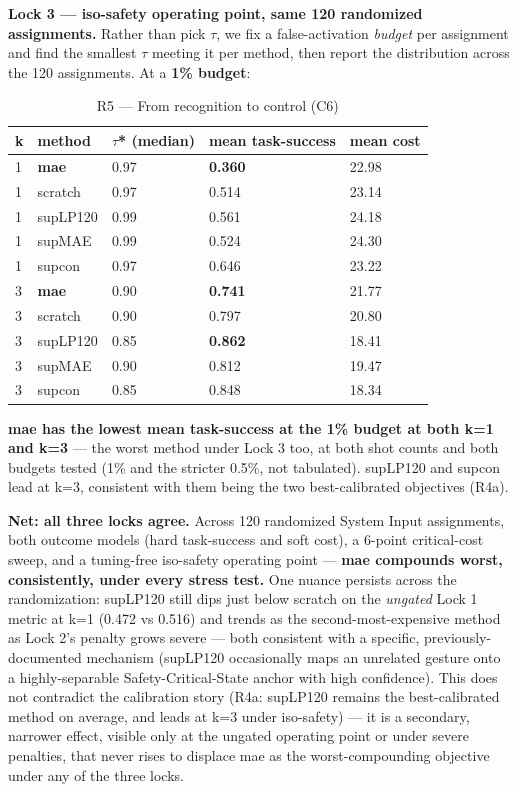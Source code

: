 \textbf{Lock 3 --- iso-safety operating point, same 120 randomized assignments.} Rather than pick $\tau$, we fix a false-activation \textit{budget} per assignment and find the smallest $\tau$ meeting it per method, then report the distribution across the 120 assignments. At a \textbf{1\% budget}:

\begin{table}[!t]
\centering
\caption{R5 --- From recognition to control (C6)}
\small
\begin{tabular}{lllll}
\toprule
k & method & $\tau$* (median) & mean task-success & mean cost \\
\midrule
1 & \textbf{mae} & 0.97 & \textbf{0.360} & 22.98 \\
1 & scratch & 0.97 & 0.514 & 23.14 \\
1 & supLP120 & 0.99 & 0.561 & 24.18 \\
1 & supMAE & 0.99 & 0.524 & 24.30 \\
1 & supcon & 0.97 & 0.646 & 23.22 \\
3 & \textbf{mae} & 0.90 & \textbf{0.741} & 21.77 \\
3 & scratch & 0.90 & 0.797 & 20.80 \\
3 & supLP120 & 0.85 & \textbf{0.862} & 18.41 \\
3 & supMAE & 0.90 & 0.812 & 19.47 \\
3 & supcon & 0.85 & 0.848 & 18.34 \\
\bottomrule
\end{tabular}
\end{table}

\textbf{mae has the lowest mean task-success at the 1\% budget at both k=1 and k=3} --- the worst method under Lock 3 too, at both shot counts and both budgets tested (1\% and the stricter 0.5\%, not tabulated). supLP120 and supcon lead at k=3, consistent with them being the two best-calibrated objectives (R4a).

\textbf{Net: all three locks agree.} Across 120 randomized System Input assignments, both outcome models (hard task-success and soft cost), a 6-point critical-cost sweep, and a tuning-free iso-safety operating point --- \textbf{mae compounds worst, consistently, under every stress test.} One nuance persists across the randomization: supLP120 still dips just below scratch on the \textit{ungated} Lock 1 metric at k=1 (0.472 vs 0.516) and trends as the second-most-expensive method as Lock 2's penalty grows severe --- both consistent with a specific, previously-documented mechanism (supLP120 occasionally maps an unrelated gesture onto a highly-separable Safety-Critical-State anchor with high confidence). This does not contradict the calibration story (R4a: supLP120 remains the best-calibrated method on average, and leads at k=3 under iso-safety) --- it is a secondary, narrower effect, visible only at the ungated operating point or under severe penalties, that never rises to displace mae as the worst-compounding objective under any of the three locks.

